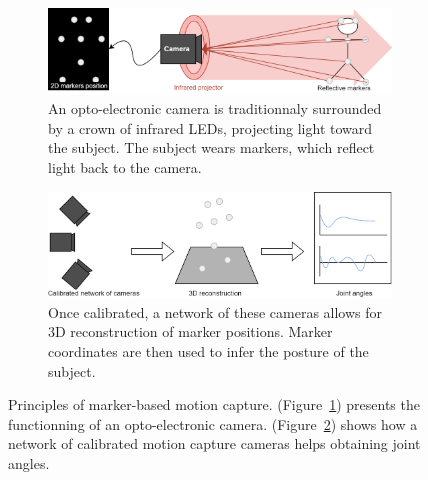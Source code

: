 \begin{figure}[hbtp]
	\centering
	\begin{subfigure}[b]{1\textwidth}
		\centering
		\def\svgwidth{\columnwidth}
		\fontsize{10pt}{10pt}\selectfont
		\includegraphics[width=\linewidth]{"../Chap1/Figure/marker_based_1.png"}
		\caption{An opto-electronic camera is traditionnaly surrounded by a crown of infrared LEDs, projecting light toward the subject. The subject wears markers, which reflect light back to the camera.}
		\label{fig_mk1}
	\end{subfigure}
	\qquad
	\begin{subfigure}[b]{1\textwidth}
		\centering
		\def\svgwidth{\columnwidth}
		\fontsize{10pt}{10pt}\selectfont
		\includegraphics[width=\linewidth]{"../Chap1/Figure/marker_based_2.png"}
		\caption{Once calibrated, a network of these cameras allows for 3D reconstruction of marker positions. Marker coordinates are then used to infer the posture of the subject.}
		\label{fig_mk2}
	\end{subfigure}
	\caption{Principles of marker-based motion capture. (Figure~\ref{fig_mk1}) presents the functionning of an opto-electronic camera. (Figure~\ref{fig_mk2}) shows how a network of calibrated motion capture cameras helps obtaining joint angles.}
	\label{fig_mk}
\end{figure}

